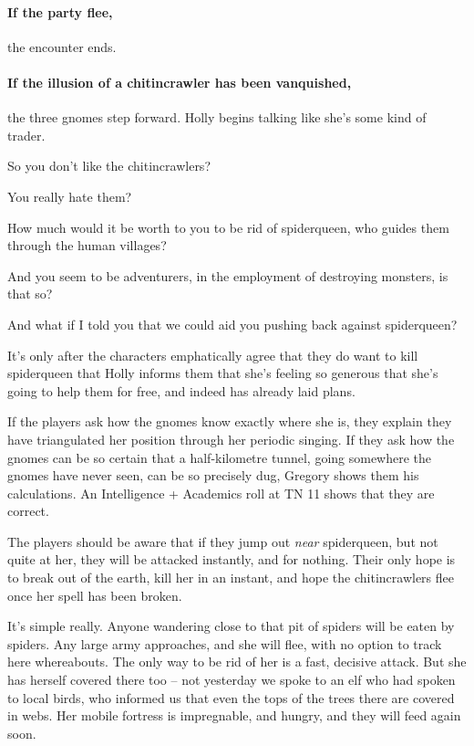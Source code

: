 \begin{multicols}{2}
\begin{boxtext}
\end{boxtext}

\paragraph{If the party flee,}
the encounter ends.

\paragraph{If the illusion of a chitincrawler has been vanquished,}
the three gnomes step forward.
Holly begins talking like she's some kind of trader.

\begin{speechtext}

  So you don't like the chitincrawlers?

  You really hate them?

  How much would it be worth to you to be rid of \gls{spiderqueen}, who guides them through the human villages?

  And you seem to be adventurers, in the employment of destroying monsters, is that so?

  And what if I told you that we could aid you pushing back against \gls{spiderqueen}?

\end{speechtext}

It's only after the characters emphatically agree that they do want to kill \gls{spiderqueen} that Holly informs them that she's feeling so generous that she's going to help them for free, and indeed has already laid plans.

If the players ask how the gnomes know exactly where she is, they explain they have triangulated her position through her periodic singing.
If they ask how the gnomes can be so certain that a half-kilometre tunnel, going somewhere the gnomes have never seen, can be so precisely dug, Gregory shows them his calculations.
An Intelligence + Academics roll at TN 11 shows that they are correct.

The players should be aware that if they jump out \emph{near} \gls{spiderqueen}, but not quite at her, they will be attacked instantly, and for nothing.  Their only hope is to break out of the earth, kill her in an instant, and hope the chitincrawlers flee once her spell has been broken.

\begin{speechtext}

  It's simple really.
  Anyone wandering close to that pit of spiders will be eaten by spiders.
  Any large army approaches, and she will flee, with no option to track here whereabouts.
  The only way to be rid of her is a fast, decisive attack.
  But she has herself covered there too -- not yesterday we spoke to an elf who had spoken to local birds, who informed us that even the tops of the trees there are covered in webs.
  Her mobile fortress is impregnable, and hungry, and they will feed again soon.


\end{speechtext}
\end{multicols}
